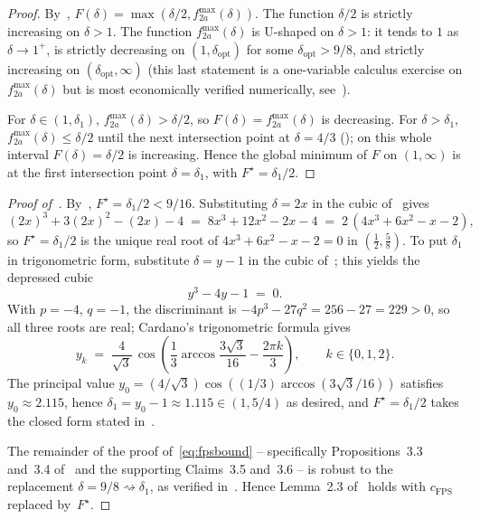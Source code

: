 \documentclass[11pt,a4paper]{article}
\theoremstyle{definition}
\newcommand{\cFPS}{c_{\mathrm{FPS}}}
\begin{document}
\begin{proof}
By~, $F(\delta)=\max(\delta/2,f_{2a}^{\max}(\delta))$.
The function $\delta/2$ is strictly increasing on $\delta>1$. The
function $f_{2a}^{\max}(\delta)$ is U-shaped on $\delta>1$: it tends to
$1$ as $\delta\to1^+$, is strictly decreasing on
$(1,\delta_{\mathrm{opt}})$ for some $\delta_{\mathrm{opt}}>9/8$, and
strictly increasing on $(\delta_{\mathrm{opt}},\infty)$ (this last
statement is a one-variable calculus exercise on
$f_{2a}^{\max}(\delta)$ but is most economically verified numerically,
see~).

For $\delta\in(1,\delta_1)$, $f_{2a}^{\max}(\delta)>\delta/2$, so
$F(\delta)=f_{2a}^{\max}(\delta)$ is decreasing. For
$\delta>\delta_1$, $f_{2a}^{\max}(\delta)\le\delta/2$ until the next
intersection point at $\delta=4/3$
(); on this whole interval
$F(\delta)=\delta/2$ is increasing. Hence the global minimum of $F$ on
$(1,\infty)$ is at the first intersection point
$\delta=\delta_1$, with $F^{\star}=\delta_1/2$.
\end{proof}

\begin{proof}[Proof of~]
By~, $F^{\star}=\delta_1/2<9/16$. Substituting
$\delta=2x$ in the cubic of~ gives
\begin{equation}\label{eq:cubic-in-F}
   (2x)^3+3(2x)^2-(2x)-4
   \;=\;
   8x^3+12x^2-2x-4
   \;=\;
   2\,(4x^3+6x^2-x-2),
\end{equation}
so $F^{\star}=\delta_1/2$ is the unique real root of $4x^3+6x^2-x-2=0$
in $(\tfrac12,\tfrac58)$. To put $\delta_1$ in trigonometric form,
substitute $\delta=y-1$ in the cubic of~; this yields
the depressed cubic
\begin{equation}\label{eq:depressed}
   y^3 - 4y - 1 \;=\; 0.
\end{equation}
With $p=-4$, $q=-1$, the discriminant is $-4p^3-27q^2 = 256-27=229>0$,
so all three roots are real; Cardano's trigonometric formula gives
\[
   y_k \;=\; \frac{4}{\sqrt3}\,
            \cos\!\left(\frac13\arccos\!\frac{3\sqrt3}{16}-\frac{2\pi k}{3}\right),
   \qquad k\in\{0,1,2\}.
\]
The principal value $y_0=(4/\sqrt3)\cos((1/3)\arccos(3\sqrt3/16))$
satisfies $y_0\approx2.115$, hence
$\delta_1=y_0-1\approx1.115\in(1,5/4)$ as desired, and
$F^{\star}=\delta_1/2$ takes the closed form stated
in~.

The remainder of the proof of~\eqref{eq:fpsbound} -- specifically
Propositions~3.3 and~3.4 of~\cite{FPS} and the supporting Claims~3.5
and~3.6 -- is robust to the replacement $\delta=9/8\rightsquigarrow\delta_1$,
as verified in~. Hence Lemma~2.3 of~\cite{FPS}
holds with $\cFPS$ replaced by~$F^{\star}$.
\end{proof}
\end{document}
